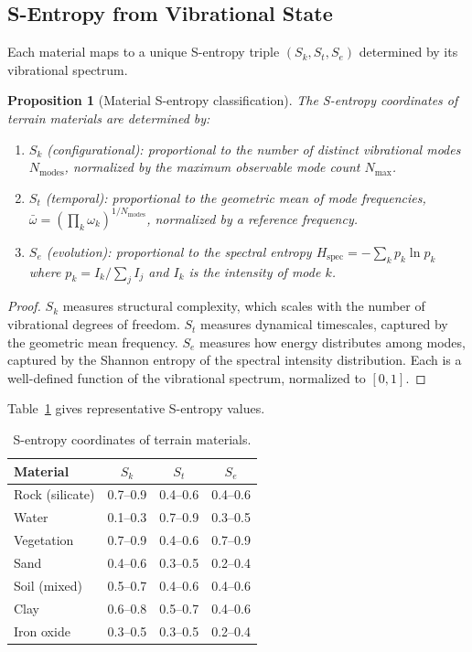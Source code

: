 \documentclass[10pt,twocolumn]{article}
\newtheorem{proposition}[theorem]{Proposition}
\theoremstyle{definition}
\theoremstyle{remark}
\newcommand{\Sk}{S_k}
\newcommand{\St}{S_t}
\newcommand{\Se}{S_e}
\begin{document}
\subsection{S-Entropy from Vibrational State}
\label{sec:sentropy_mat}

Each material maps to a unique S-entropy triple
$(\Sk,\St,\Se)$ determined by its vibrational spectrum.

\begin{proposition}[Material S-entropy classification]
\label{prop:mat_sentropy}
The S-entropy coordinates of terrain materials are determined
by:
\begin{enumerate}[leftmargin=*,itemsep=2pt]
\item $\Sk$ (configurational): proportional to the number of
  distinct vibrational modes $N_{\mathrm{modes}}$,
  normalized by the maximum observable mode count
  $N_{\max}$.
\item $\St$ (temporal): proportional to the geometric mean
  of mode frequencies,
  $\bar{\omega}=(\prod_k\omega_k)^{1/N_{\mathrm{modes}}}$,
  normalized by a reference frequency.
\item $\Se$ (evolution): proportional to the spectral entropy
  $H_{\mathrm{spec}} = -\sum_k p_k\ln p_k$ where
  $p_k = I_k/\sum_j I_j$ and $I_k$ is the intensity of
  mode $k$.
\end{enumerate}
\end{proposition}

\begin{proof}
$\Sk$ measures structural complexity, which scales with the
number of vibrational degrees of freedom.  $\St$ measures
dynamical timescales, captured by the geometric mean frequency.
$\Se$ measures how energy distributes among modes, captured by
the Shannon entropy of the spectral intensity distribution.
Each is a well-defined function of the vibrational spectrum,
normalized to $[0,1]$.
\end{proof}

Table~\ref{tab:sentropy_mat} gives representative S-entropy
values.

\begin{table}[H]
\centering
\caption{S-entropy coordinates of terrain materials.}
\label{tab:sentropy_mat}
\begin{tabular}{@{}lccc@{}}
\toprule
\textbf{Material} & $\Sk$ & $\St$ & $\Se$ \\
\midrule
Rock (silicate) & 0.7--0.9 & 0.4--0.6 & 0.4--0.6 \\
Water & 0.1--0.3 & 0.7--0.9 & 0.3--0.5 \\
Vegetation & 0.7--0.9 & 0.4--0.6 & 0.7--0.9 \\
Sand & 0.4--0.6 & 0.3--0.5 & 0.2--0.4 \\
Soil (mixed) & 0.5--0.7 & 0.4--0.6 & 0.4--0.6 \\
Clay & 0.6--0.8 & 0.5--0.7 & 0.4--0.6 \\
Iron oxide & 0.3--0.5 & 0.3--0.5 & 0.2--0.4 \\
\bottomrule
\end{tabular}
\end{table}
\end{document}
